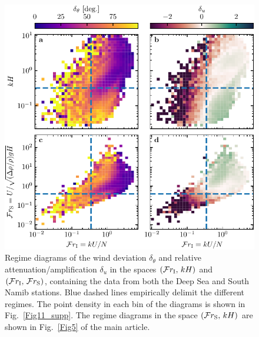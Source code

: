 \begin{figure}
  \centering
  \includegraphics[scale=1]{Figures/Figure12_supp.pdf}
  \caption{Regime diagrams of the wind deviation $\delta_{\theta}$ and relative attenuation/amplification $\delta_{u}$ in the spaces $(\mathcal{F}r_{\textup{I}}, \, kH)$ and $(\mathcal{F}r_{\textup{I}}, \, \mathcal{F}r_{\textup{S}})$, containing the data from both the Deep Sea and South Namib stations. Blue dashed lines empirically delimit the different regimes. The point density in each bin of the diagrams is shown in Fig.~\ref{Fig11_supp}. The regime diagrams in the space $(\mathcal{F}r_{\textup{S}}, \, kH)$ are shown in Fig.~\ref{Fig5} of the main article.}
  \label{Fig12_supp}
\end{figure}

